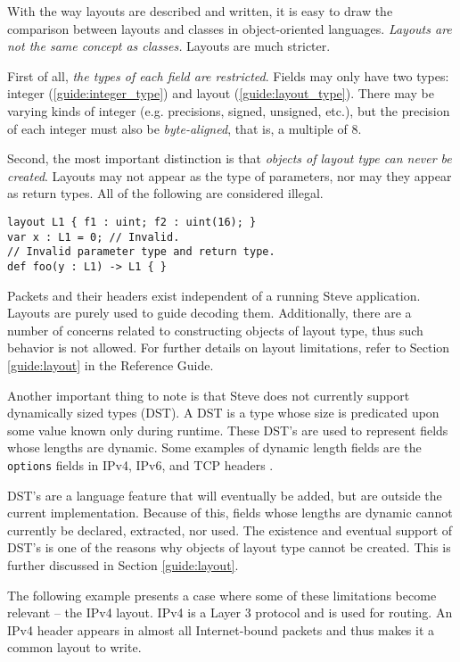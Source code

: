 With the way
layouts are described and written, it is easy to draw the comparison between layouts and
classes in object-oriented languages. \textit{Layouts are not the same concept as classes.} Layouts are much stricter.

First of all, \textit{the types of each field are restricted}. Fields may only
have two types: integer (\ref{guide:integer_type}) and layout
(\ref{guide:layout_type}). There may be varying kinds of integer (e.g.
precisions, signed, unsigned, etc.), but the precision of each integer must also
be \textit{byte-aligned}, that is, a multiple of 8.

Second, the most important distinction is that \textit{objects of layout type
can never be created}. Layouts may not appear as the type of parameters, nor may
they appear as return types. All of the following are considered illegal.

\begin{codepage}
\begin{lstlisting}
layout L1 { f1 : uint; f2 : uint(16); }
var x : L1 = 0; // Invalid.
// Invalid parameter type and return type.
def foo(y : L1) -> L1 { }
\end{lstlisting}
\end{codepage}

Packets and their headers exist independent of a running Steve application.
Layouts are purely used to guide decoding them. Additionally, there are a number
of concerns related to constructing objects of layout type, thus such behavior
is not allowed. For further details on layout limitations, refer to Section
\ref{guide:layout} in the Reference Guide.

Another important thing to note is that Steve does not currently support dynamically
sized types (DST). A DST is a type whose size is predicated upon some value
known only during runtime. These DST's are used to represent fields whose
lengths are dynamic. Some examples of dynamic length fields are the
\texttt{options} fields in IPv4, IPv6, and TCP headers \cite{ipv4_std, ipv6_std,
tcp_std}.

DST's are a language feature that will eventually be added, but are outside the
current implementation. Because of this, fields whose lengths are dynamic cannot
currently be declared, extracted, nor used. The existence and eventual support
of DST's is one of the reasons why objects of layout type cannot be created.
This is further discussed in Section \ref{guide:layout}.

The following example presents a case where some of these limitations become relevant -- the IPv4 layout. IPv4 is a Layer 3 protocol and is used
for routing. An IPv4 header appears in almost all Internet-bound packets and
thus makes it a common layout to write.

